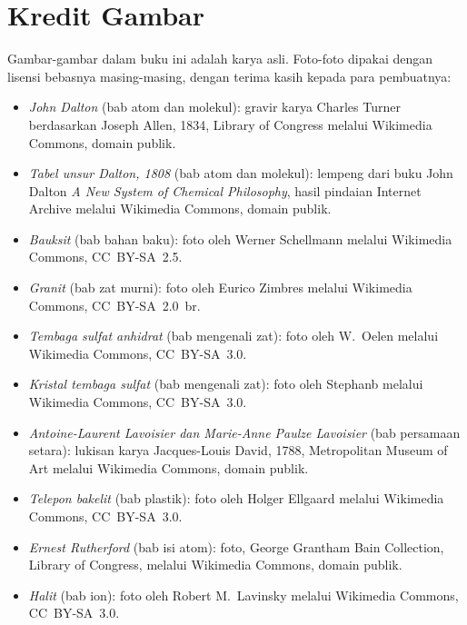 \chapter*{Kredit Gambar}

Gambar-gambar dalam buku ini adalah karya asli. Foto-foto dipakai dengan
lisensi bebasnya masing-masing, dengan terima kasih kepada para
pembuatnya:

\begin{itemize}
  \item \emph{John Dalton} (bab atom dan molekul): gravir karya Charles
        Turner berdasarkan Joseph Allen, 1834, Library of Congress
        melalui Wikimedia Commons, domain publik.
  \item \emph{Tabel unsur Dalton, 1808} (bab atom dan molekul): lempeng
        dari buku John Dalton \emph{A New System of Chemical
        Philosophy}, hasil pindaian Internet Archive melalui Wikimedia
        Commons, domain publik.
  \item \emph{Bauksit} (bab bahan baku): foto oleh Werner Schellmann
        melalui Wikimedia Commons, CC\ BY-SA\ 2.5.
  \item \emph{Granit} (bab zat murni): foto oleh Eurico Zimbres melalui
        Wikimedia Commons, CC\ BY-SA\ 2.0\ br.
  \item \emph{Tembaga sulfat anhidrat} (bab mengenali zat): foto oleh
        W.~Oelen melalui Wikimedia Commons, CC\ BY-SA\ 3.0.
  \item \emph{Kristal tembaga sulfat} (bab mengenali zat): foto oleh
        Stephanb melalui Wikimedia Commons, CC\ BY-SA\ 3.0.
  \item \emph{Antoine-Laurent Lavoisier dan Marie-Anne Paulze Lavoisier}
        (bab persamaan setara): lukisan karya Jacques-Louis David, 1788,
        Metropolitan Museum of Art melalui Wikimedia Commons, domain
        publik.
  \item \emph{Telepon bakelit} (bab plastik): foto oleh Holger Ellgaard
        melalui Wikimedia Commons, CC\ BY-SA\ 3.0.
  \item \emph{Ernest Rutherford} (bab isi atom): foto, George Grantham
        Bain Collection, Library of Congress, melalui Wikimedia Commons,
        domain publik.
  \item \emph{Halit} (bab ion): foto oleh Robert M.~Lavinsky melalui
        Wikimedia Commons, CC\ BY-SA\ 3.0.

\end{itemize}
